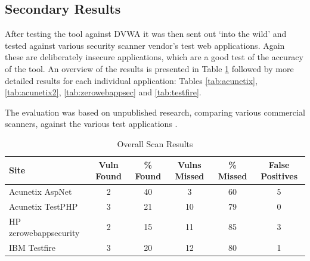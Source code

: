 \documentclass[12pt,a4paper]{article}
\begin{document}
\subsection{Secondary Results}
After testing the tool against DVWA it was then sent out `into the wild' and tested against various security scanner vendor's test web applications.  Again these are deliberately insecure applications, which are a good test of the accuracy of the tool.  An overview of the results is presented in Table \ref{tab:secondary_results} followed by more detailed results for each individual application: Tables \ref{tab:acunetix}, \ref{tab:acunetix2}, \ref{tab:zerowebappsec} and \ref{tab:testfire}.

The evaluation was based on unpublished research, comparing various commercial scanners, against the various test applications \cite{Suto2010}.

\begin{center}
    \begin{table}
        \caption{Overall Scan Results}
        \begin{center}
            \begin{tabular}{ | l | c | c | c | c | c | }
                \hline
                Site & Vuln Found & \% Found & Vulns Missed & \% Missed & False Positives  \\ \hline
                Acunetix AspNet & 2 & 40 & 3 & 60 & 5 \\ \hline
                Acunetix TestPHP & 3 & 21 & 10 & 79 & 0 \\ \hline
                HP zerowebappsecurity & 2 & 15 & 11 & 85 & 3 \\ \hline
                IBM Testfire & 3 & 20 & 12 & 80 & 1 \\ 
                \hline
            \end{tabular}
        \end{center}
        \label{tab:secondary_results}
    \end{table}
\end{center}
\end{document}
